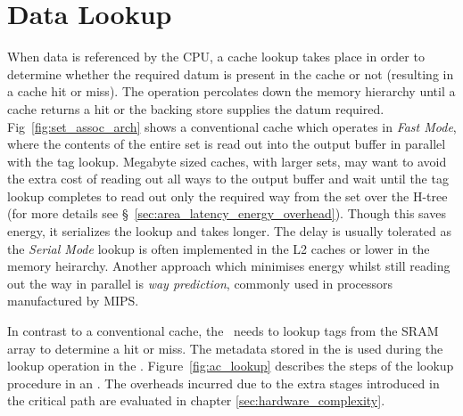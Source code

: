 \section{Data Lookup}

When data is referenced by the CPU, a cache lookup takes place in order to determine whether the required datum is present in the cache or not (resulting in a cache hit or miss). The operation percolates down the memory hierarchy until a cache returns a hit or the backing store supplies the datum required. Fig~\ref{fig:set_assoc_arch} shows a conventional cache which operates in \textit{Fast Mode}, where the contents of the entire set is read out into the output buffer in parallel with the tag lookup. Megabyte sized caches, with larger sets, may want to avoid the extra cost of reading out all ways to the output buffer and wait until the tag lookup completes to read out only the required way from the set over the H-tree (for more details see \S~\ref{sec:area_latency_energy_overhead}). Though this saves energy, it serializes the lookup and takes longer. The delay is usually tolerated as the \textit{Serial Mode} lookup is often implemented in the L2 caches or lower in the memory heirarchy. Another approach which minimises energy whilst still reading out the way in parallel is \textit{way prediction}\cite{patent:DataCacheWayPrediction,patent:WayPredictionVirtualHint}, commonly used in processors manufactured by MIPS.

In contrast to a conventional cache, the \AC\ needs to lookup tags from the SRAM array to determine a hit or miss. The metadata stored in the  is used during the lookup operation in the \AC{}. Figure~\ref{fig:ac_lookup} describes the steps of the lookup procedure in an \AC{}. The overheads incurred due to the extra stages introduced in the critical path are evaluated in chapter \ref{sec:hardware_complexity}.


